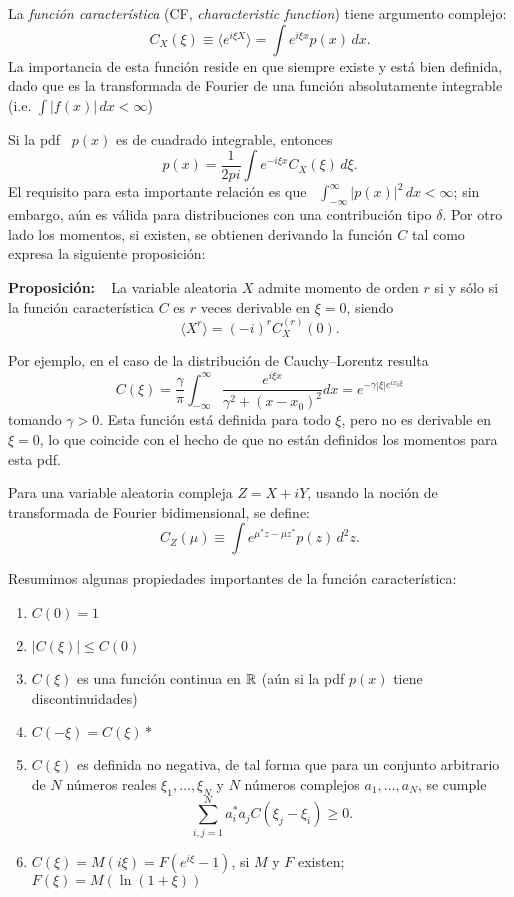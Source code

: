 {\hfill

La \emph{funci\'on caracter\'istica}  (CF, \emph{characteristic function}) tiene
argumento complejo: \cite{Luk61}
$$
C_X(\xi) \equiv \langle e^{i \xi X} \rangle = \int e^{i \xi x} p(x) \, dx .
$$
La importancia  de esta  funci\'on reside  en que siempre  existe y  est\'a bien
definida, dado que es la  transformada de Fourier de una funci\'on absolutamente
integrable (i.e. $\int |f(x)| \, dx < \infty$) \cite{Gol61}

Si la pdf \ $p(x)$ es de cuadrado integrable, entonces 
$$
p(x) = \frac{1}{2	pi} \int e^{-i \xi x} C_X(\xi) \, d\xi .
$$
El requisito  para esta importante relaci\'on es  que \ $\int_{-\infty}^{\infty}
|p(x)|^2 \, dx<\infty$;  sin embargo, a\'un es v\'alida  para distribuciones con
una contribuci\'on  tipo $\delta$.  Por otro  lado los momentos,  si existen, se
obtienen derivando la funci\'on $C$ tal como expresa la siguiente proposici\'on:

\textbf{Proposici\'on:} \ %
La  variable aleatoria  $X$  admite  momento de  orden  $r$ si  y  s\'olo si  la
funci\'on caracter\'istica $C$ es $r$ veces derivable en $\xi=0$, siendo
$$
\langle X^r\rangle = (-i)^r C_X^{(r)}(0) . 
$$

Por ejemplo, en el caso de la distribuci\'on de Cauchy--Lorentz resulta
$$
C(\xi)     =     \frac{\gamma}{\pi}    \int_{-\infty}^{\infty}     \frac{e^{i\xi
    x}}{\gamma^2+(x-x_0)^2} dx = e^{-\gamma |\xi| e^{i x_0\xi}}
$$
tomando $\gamma >0$. Esta funci\'on est\'a  definida para todo $\xi$, pero no es
derivable en $\xi=0$,  lo que coincide con el hecho de  que no est\'an definidos
los momentos para esta pdf.

Para  una   variable  aleatoria  compleja   $Z=X+iY$,  usando  la   noci\'on  de
transformada de Fourier bidimensional, se define:
$$
C_Z(\mu) \equiv \int e^{\mu^* z-\mu z^*} p(z) \, d^2z .
$$

Resumimos algunas propiedades importantes de la funci\'on caracter\'istica:
\begin{enumerate}
\item $C(0) =1$
%
\item $|C(\xi)|\leq C(0)$ %
%
\item $C(\xi)$  es una  funci\'on continua  en $\mathbb{R}$ (a\'un  si la  pdf $p(x)$
  tiene discontinuidades) %
%
\item $C(-\xi) = C(\xi)*$
%
\item  $C(\xi)$ es  definida no  negativa,  de tal  forma que  para un  conjunto
  arbitrario  de  $N$  n\'umeros  reales $\xi_1,\ldots,\xi_N$  y  $N$  n\'umeros
  complejos $a_1,\ldots,a_N$, se cumple
  $$
  \sum_{i,j=1}^N a_i^* a_j C(\xi_j-\xi_i) \geq 0 .
  $$
%
\item  $C(\xi) =  M(i\xi) =  F(e^{i\xi}-1)$, si  $M$ y  $F$ existen;  \ $F(\xi)=
  M(\ln(1+\xi))$
\end{enumerate}

}
